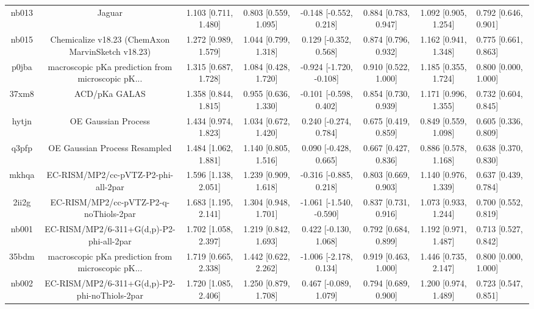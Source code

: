 \documentclass{article}
\begin{document}
\begin{center}
\begin{longtable}{|ccccccc|}
 nb013 &                                             Jaguar &  1.103 [0.711, 1.480] &  0.803 [0.559, 1.095] &   -0.148 [-0.552, 0.218] &  0.884 [0.783, 0.947] &   1.092 [0.905, 1.254] &   0.792 [0.646, 0.901] \\
 nb015 &  Chemicalize v18.23 (ChemAxon MarvinSketch v18.23) &  1.272 [0.989, 1.579] &  1.044 [0.799, 1.318] &    0.129 [-0.352, 0.568] &  0.874 [0.796, 0.932] &   1.162 [0.941, 1.348] &   0.775 [0.661, 0.863] \\
 p0jba &  macroscopic pKa prediction from microscopic pK... &  1.315 [0.687, 1.728] &  1.084 [0.428, 1.720] &  -0.924 [-1.720, -0.108] &  0.910 [0.522, 1.000] &   1.185 [0.355, 1.724] &   0.800 [0.000, 1.000] \\
 37xm8 &                                      ACD/pKa GALAS &  1.358 [0.844, 1.815] &  0.955 [0.636, 1.330] &   -0.101 [-0.598, 0.402] &  0.854 [0.730, 0.939] &   1.171 [0.996, 1.355] &   0.732 [0.604, 0.845] \\
 hytjn &                                OE Gaussian Process &  1.434 [0.974, 1.823] &  1.034 [0.672, 1.420] &    0.240 [-0.274, 0.784] &  0.675 [0.419, 0.859] &   0.849 [0.559, 1.098] &   0.605 [0.336, 0.809] \\
 q3pfp &                      OE Gaussian Process Resampled &  1.484 [1.062, 1.881] &  1.140 [0.805, 1.516] &    0.090 [-0.428, 0.665] &  0.667 [0.427, 0.836] &   0.886 [0.578, 1.168] &   0.638 [0.370, 0.830] \\
 mkhqa &                EC-RISM/MP2/cc-pVTZ-P2-phi-all-2par &  1.596 [1.138, 2.051] &  1.239 [0.909, 1.618] &   -0.316 [-0.885, 0.218] &  0.803 [0.669, 0.903] &   1.140 [0.976, 1.339] &   0.637 [0.439, 0.784] \\
 2ii2g &             EC-RISM/MP2/cc-pVTZ-P2-q-noThiols-2par &  1.683 [1.195, 2.141] &  1.304 [0.948, 1.701] &  -1.061 [-1.540, -0.590] &  0.837 [0.731, 0.916] &   1.073 [0.933, 1.244] &   0.700 [0.552, 0.819] \\
 nb001 &           EC-RISM/MP2/6-311+G(d,p)-P2-phi-all-2par &  1.702 [1.058, 2.397] &  1.219 [0.842, 1.693] &    0.422 [-0.130, 1.068] &  0.792 [0.684, 0.899] &   1.192 [0.971, 1.487] &   0.713 [0.527, 0.842] \\
 35bdm &  macroscopic pKa prediction from microscopic pK... &  1.719 [0.665, 2.338] &  1.442 [0.622, 2.262] &   -1.006 [-2.178, 0.134] &  0.919 [0.463, 1.000] &   1.446 [0.735, 2.147] &   0.800 [0.000, 1.000] \\
 nb002 &      EC-RISM/MP2/6-311+G(d,p)-P2-phi-noThiols-2par &  1.720 [1.085, 2.406] &  1.250 [0.879, 1.708] &    0.467 [-0.089, 1.079] &  0.794 [0.689, 0.900] &   1.200 [0.974, 1.489] &   0.723 [0.547, 0.851] \\

\end{longtable}
\end{center}
\end{document}
